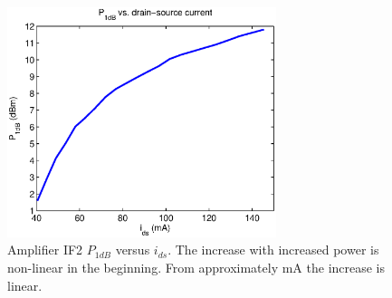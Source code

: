 				\begin{figure}[h!]
					\centering
					\includegraphics[width=0.7\textwidth]{fig/amplifiers/if2/p1dbvscurrent}
					\caption[Amplifier IF2 $P_{1dB}$ versus $i_{ds}$.]{Amplifier IF2 $P_{1dB}$ versus $i_{ds}$. The increase with increased power is non-linear in the beginning. From approximately \unit[90]{mA} the increase is linear.}\label{fig:if2p1dbvspower}
				\end{figure}				
				
